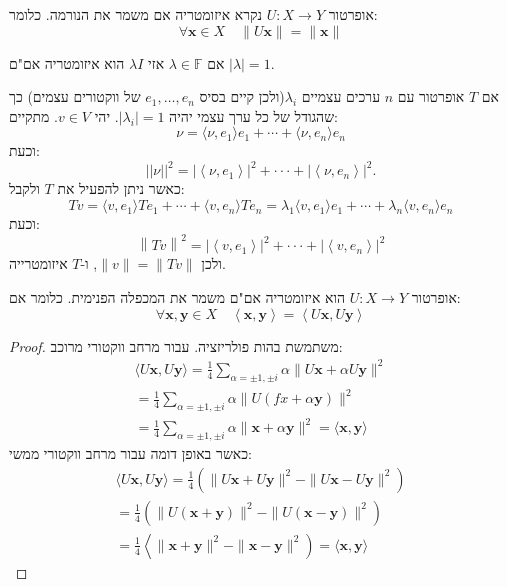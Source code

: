 \documentclass{tstextbook}
\begin{document}
\begin{definition}[איזומטריה]
אופרטור \(U:X\to Y\) נקרא איזומטריה אם משמר את הנורמה. כלומר:
$$\forall\mathbf{x}\in X\quad \|U\mathbf{x}\|=\|\mathbf{x}\|$$

\end{definition}
\begin{example}
אם \(\lambda \in \mathbb{F}\) אזי \(\lambda I\) הוא איזומטריה אם"ם \(\left\lvert  \lambda  \right\rvert=1\).

\end{example}
\begin{example}
אם \(T\) אופרטור עם \(n\) ערכים עצמיים \(\lambda_{i}\)(ולכן קיים בסיס \(e_{1},\dots,e_{n}\) של ווקטורים עצמים) כך שהגודל של כל ערך עצמי יהיה \(\left\lvert  \lambda_{i}  \right\rvert=1\). יהי \(v \in V\). מתקיים:
$$\nu=\langle\nu,e_{1}\rangle e_{1}+\cdots+\langle\nu,e_{n}\rangle e_{n}$$
וכעת:
$$\left|\left|\nu\right|\right|^{2}=|\left\langle\nu,e_{1}\right\rangle|^{2}+\cdot\cdot\cdot+|\left\langle\nu,e_{n}\right\rangle|^{2}.$$
כאשר ניתן להפעיל את \(T\) ולקבל:
$$Tv=\langle v,e_{1}\rangle Te_{1}+\cdots+\langle v,e_{n}\rangle Te_{n}=\lambda_{1}\langle v,e_{1}\rangle e_{1}+\cdots+\lambda_{n}\langle v,e_{n}\rangle e_{n}$$
וכעת:
$$\left\|T v\right\|^{2}=|\left\langle v,e_{1}\right\rangle|^{2}+\cdot\cdot\cdot+|\left\langle v,e_{n}\right\rangle|^{2}$$
ולכן \(\lVert v \rVert=\lVert Tv \rVert\), ו-\(T\) איזומטרייה.

\end{example}
\begin{proposition}
אופרטור \(U:X\to Y\) הוא איזומטריה אם"ם משמר את המכפלה הפנימית. כלומר אם:
$$\forall\mathbf{x},\mathbf{y}\in X\quad \left\langle \mathbf{x},\mathbf{y} \right \rangle =\left\langle U\mathbf{x},U\mathbf{y} \right \rangle $$

\end{proposition}
\begin{proof}
משתמשת בהות פולריזציה. עבור מרחב ווקטורי מרוכב:
\begin{gather*}{{ \langle U\mathbf{x},U\mathbf{y} \rangle =\frac{1}{4}\sum_{\alpha=\pm1,\pm i}\alpha\|U\mathbf{x}+\alpha U\mathbf{y}\|^{2}}}\\ {{=\frac{1}{4}\sum_{\alpha=\pm1,\pm i}\alpha\|U( f{x}+\alpha\mathbf{y})\|^{2}}}\\ {{=\frac{1}{4}\sum_{\alpha=\pm1,\pm i}\alpha\|\mathbf{x}+\alpha\mathbf{y}\|^{2}=\langle \mathbf{x},\mathbf{y} \rangle }}\end{gather*}
כאשר באופן דומה עבור מרחב ווקטורי ממשי:
\begin{gather*}{{\langle U\mathbf{x},U\mathbf{y} \rangle =\frac{1}{4}\left( \|U\mathbf{x}+U\mathbf{y}\|^{2}-\|U\mathbf{x}-U\mathbf{y}\|^{2}\right)}}\\ {{=\frac{1}{4}\left(\|U(\mathbf{x}+\mathbf{y})\|^{2}-\|U ( \mathbf{x}-\mathbf{y})\|^{2}\right)}}\\ {{=\frac{1}{4}\left \langle \|\mathbf{x}+\mathbf{y}\|^{2}-\|\mathbf{x}-\mathbf{y}\|^{2}\right)= \langle \mathbf{x},\mathbf{y} \rangle }}\end{gather*}

\end{proof}
\end{document}
